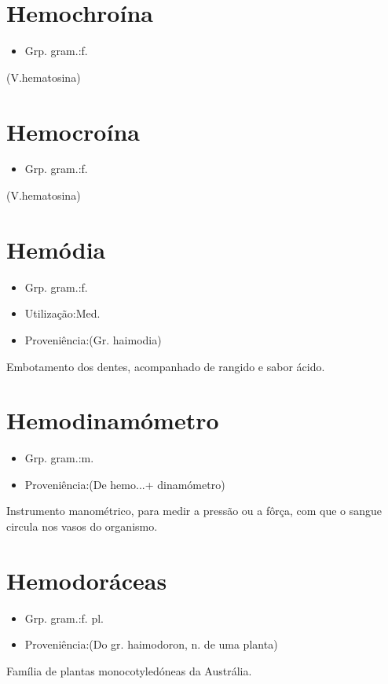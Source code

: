 \documentclass{article}
\begin{document}
\section{Hemochroína}
\begin{itemize}
\item {Grp. gram.:f.}
\end{itemize}
(V.hematosina)
\section{Hemocroína}
\begin{itemize}
\item {Grp. gram.:f.}
\end{itemize}
(V.hematosina)
\section{Hemódia}
\begin{itemize}
\item {Grp. gram.:f.}
\end{itemize}
\begin{itemize}
\item {Utilização:Med.}
\end{itemize}
\begin{itemize}
\item {Proveniência:(Gr. \textunderscore haimodia\textunderscore )}
\end{itemize}
Embotamento dos dentes, acompanhado de rangido e sabor ácido.
\section{Hemodinamómetro}
\begin{itemize}
\item {Grp. gram.:m.}
\end{itemize}
\begin{itemize}
\item {Proveniência:(De \textunderscore hemo...\textunderscore  + \textunderscore dinamómetro\textunderscore )}
\end{itemize}
Instrumento manométrico, para medir a pressão ou a fôrça, com que o sangue circula nos vasos do organismo.
\section{Hemodoráceas}
\begin{itemize}
\item {Grp. gram.:f. pl.}
\end{itemize}
\begin{itemize}
\item {Proveniência:(Do gr. \textunderscore haimodoron\textunderscore , n. de uma planta)}
\end{itemize}
Família de plantas monocotyledóneas da Austrália.
\end{document}
